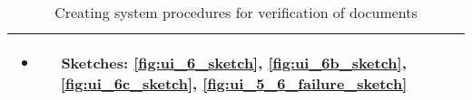 \begin{table}[H]
\begin{tabularx}{0.75\linewidth}{||Sc|X||}
\begin{minipage}[l]{\linewidth}
            \begin{itemize}[wide, labelindent=0pt]
                \vspace{4pt}
                \item Sketches: \ref{fig:ui_6_sketch}, \ref{fig:ui_6b_sketch}, \ref{fig:ui_6c_sketch}, \ref{fig:ui_5_6_failure_sketch}
                \vspace{4pt}
            \end{itemize}
        \end{minipage}  \\
        \hline
        \hline
    \end{tabularx}
    \caption{Creating system procedures for verification of documents}
    \label{tab:use_case_create_sys_procedures}
\end{table}

